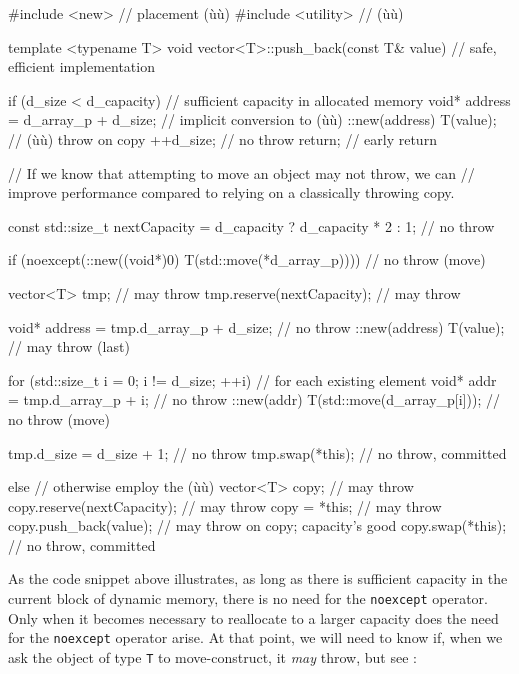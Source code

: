 \begin{emcppslisting}[emcppsbatch=e16]
#include <new>      // placement (ù{}ù)
#include <utility>  // (ù{}ù)

template <typename T>
void vector<T>::push_back(const T& value)  // safe, efficient implementation
{
    if (d_size < d_capacity)  // sufficient capacity in allocated memory
    {
        void* address = d_array_p + d_size;  // implicit conversion to (ù{}ù)
        ::new(address) T(value);             // (ù{}ù) throw on copy
        ++d_size;                            // no throw
        return;                              // early return
    }

    // If we know that attempting to move an object may not throw, we can
    // improve performance compared to relying on a classically throwing copy.

    const std::size_t nextCapacity = d_capacity ? d_capacity * 2
                                                : 1;              // no throw

    if (noexcept(::new((void*)0) T(std::move(*d_array_p))))  // no throw (move)
    {
        vector<T> tmp;                             // may throw
        tmp.reserve(nextCapacity);                 // may throw

        void* address = tmp.d_array_p + d_size;    // no throw
        ::new(address) T(value);                   // may throw (last)

        for (std::size_t i = 0; i != d_size; ++i)  // for each existing element
        {
            void* addr = tmp.d_array_p + i;          // no throw
            ::new(addr) T(std::move(d_array_p[i]));  // no throw (move)
        }

        tmp.d_size = d_size + 1;  // no throw
        tmp.swap(*this);          // no throw, committed
    }
    else                             // otherwise employ the (ù{}ù)
    {
        vector<T> copy;              // may throw
        copy.reserve(nextCapacity);  // may throw
        copy = *this;                // may throw
        copy.push_back(value);       // may throw on copy; capacity's good
        copy.swap(*this);            // no throw, committed
    }
}
\end{emcppslisting}
    

\noindent As the code snippet above illustrates, as long as there is sufficient
capacity in the current block of dynamic memory, there is no need for
the \lstinline!noexcept! operator. Only when it becomes necessary to
reallocate to a larger capacity does the need for the \lstinline!noexcept!
operator arise. At that point, we will need to know if, when we ask the
object of type \lstinline!T! to move-construct, it \emph{may} throw, but
see :

